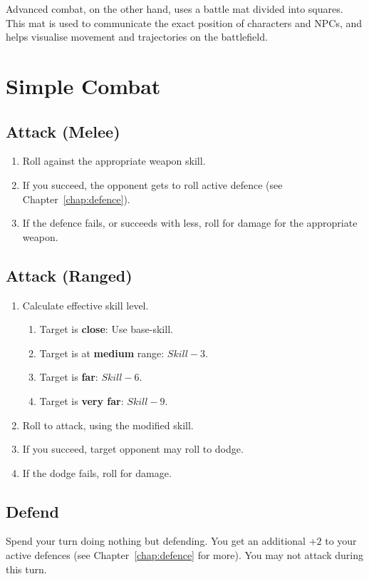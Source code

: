 Advanced combat, on the other hand, uses a battle mat divided into squares. This mat is used to communicate the exact position of characters and NPCs, and helps visualise movement and trajectories on the battlefield.

\newpage
\section{Simple Combat}

\subsection{Attack (Melee)}
\begin{enumerate}
    \item Roll against the appropriate weapon skill.
    \item If you succeed, the opponent gets to roll active defence (see Chapter~\ref{chap:defence}).
    \item If the defence fails, or succeeds with less, roll for damage for the appropriate weapon.
\end{enumerate}

\subsection{Attack (Ranged)}
\begin{enumerate}
    \item Calculate effective skill level.
        \begin{enumerate}
            \item Target is \textbf{close}: Use base-skill.
            \item Target is at \textbf{medium} range: $Skill-3$.
            \item Target is \textbf{far}: $Skill-6$.
            \item Target is \textbf{very far}: $Skill-9$.
        \end{enumerate}
    \item Roll to attack, using the modified skill.
    \item If you succeed, target opponent may roll to dodge.
    \item If the dodge fails, roll for damage.
\end{enumerate}

\subsection{Defend}
Spend your turn doing nothing but defending. 
You get an additional $+2$ to your active defences (see Chapter~\ref{chap:defence} for more). 
You may not attack during this turn.

